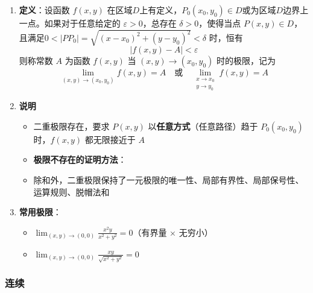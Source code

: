 \documentclass[../book.tex]{subfiles}
\begin{document}
    \begin{enumerate}
        \item \textbf{定义}：设函数 $f(x,y)$ 在区域$D$上有定义，$P_0(x_0, y_0) \in D$或为区域$D$边界上一点。如果对于任意给定的 $\varepsilon > 0$，总存在 $\delta > 0$，使得当点 $P(x,y) \in D$，且满足$0 < |PP_0| = \sqrt {(x-x_0)^2 + (y-y_0)^2} < \delta$ 时，恒有
        \[
            |f(x,y) - A| < \varepsilon
        \]
        则称常数 $A$ 为函数 $f(x,y)$ 当 $(x,y) \to (x_0,y_0)$ 时的极限，记为
        \[
            \lim_{(x,y) \to (x_0,y_0)} f(x,y) = A \quad \text{或} \quad \lim_{\substack{x \to x_0 \\ y \to y_0}} f(x,y) = A
        \]

        \item \textbf{说明}
        \begin{itemize}
            \item 二重极限存在，要求 $P(x,y)$ 以\textbf{任意方式}（任意路径）趋于 $P_0(x_0,y_0)$ 时，$f(x,y)$ 都无限接近于 $A$
            \item \textbf{极限不存在的证明方法}：
            \item 除{}和{}外，二重极限保持了一元极限的唯一性、局部有界性、局部保号性、运算规则、脱帽法和{\color{red}{夹逼准则}}
        \end{itemize}

        \item \textbf{常用极限}：
        \begin{itemize}
            \item $\displaystyle\lim_{(x,y) \to (0,0)} \frac{x^2y}{x^2+y^2} = 0$（有界量 $\times$ 无穷小）
            \item $\displaystyle\lim_{(x,y) \to (0,0)} \frac{xy}{\sqrt{x^2+y^2}} = 0$
        \end{itemize}

    \end{enumerate}

    \subsubsection{连续}
\end{document}

